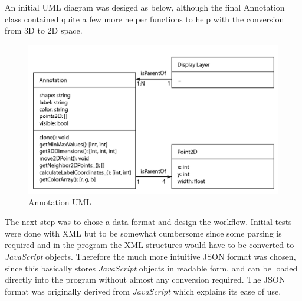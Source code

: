 \documentclass[a4paper,11pt,twoside]{article}
\begin{document}
An initial UML diagram was desiged as below, although the final Annotation class contained quite a few more helper functions to help with the conversion from 3D to 2D space.

\begin{figure}[ht!]
\centering
\includegraphics[width=140mm]{graphics/annoUML_01.png}
\caption{Annotation UML}
\label{fig:UIdesign1}
\end{figure}





The next step was to chose a data format and design the workflow. Initial tests were done with XML but to be somewhat cumbersome since some parsing is required and in the program the XML structures would have to be converted to \textit{JavaScript} objects. Therefore the much more intuitive JSON format was chosen, since this basically stores \textit{JavaScript} objects in readable form, and can be loaded directly into the program without almost any conversion required. The JSON format was originally derived from \textit{JavaScript} which explains its ease of use.
\end{document}

